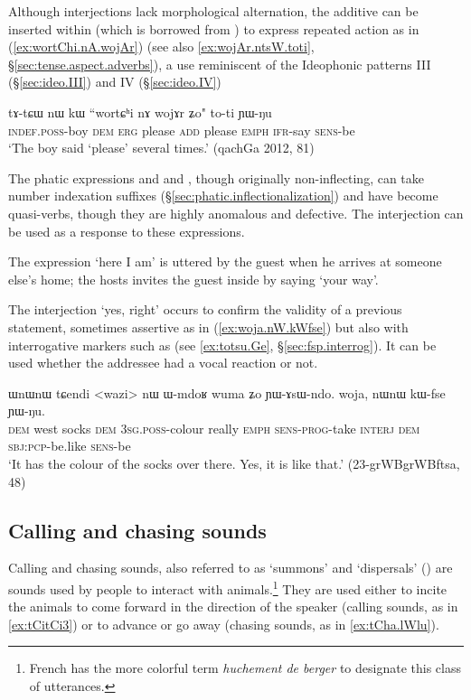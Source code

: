 Although interjections lack morphological alternation, the additive  can be inserted within  (which is borrowed from ) to express repeated action as in (\ref{ex:wortChi.nA.wojAr}) (see also \ref{ex:wojAr.ntsW.toti}, §\ref{sec:tense.aspect.adverbs}), a use reminiscent of the Ideophonic patterns III (§\ref{sec:ideo.III}) and IV (§\ref{sec:ideo.IV})

 \begin{exe}
\ex \label{ex:wortChi.nA.wojAr}
\gll tɤ-tɕɯ nɯ kɯ ``wortɕʰi nɤ wojɤr ʑo" to-ti ɲɯ-ŋu \\
\textsc{indef}.\textsc{poss}-boy \textsc{dem} \textsc{erg} please \textsc{add} please \textsc{emph} \textsc{ifr}-say \textsc{sens}-be \\
\glt `The boy said `please' several times.' (qachGa 2012, 81)
\end{exe}

The phatic expressions and  and , though originally non-inflecting, can take number indexation suffixes (§\ref{sec:phatic.inflectionalization}) and have become quasi-verbs, though they are highly anomalous and defective. The interjection  can be used as a response to these expressions.

The expression  `here I am' is uttered by the guest when he arrives at someone else's home; the hosts invites the guest inside by saying  `your way'.

The interjection  `yes, right' occurs to confirm the validity of a previous statement, sometimes assertive as in (\ref{ex:woja.nW.kWfse}) but also with interrogative markers such as  (see \ref{ex:totsu.Ge}, §\ref{sec:fsp.interrog}). It can be used whether the addressee had a vocal reaction or not.

\begin{exe}
\ex \label{ex:woja.nW.kWfse}
\gll ɯnɯnɯ tɕendi <wazi> nɯ ɯ-mdoʁ wuma ʑo ɲɯ-ɤsɯ-ndo. woja, nɯnɯ kɯ-fse ɲɯ-ŋu. \\
\textsc{dem} west socks \textsc{dem} \textsc{3sg}.\textsc{poss}-colour really \textsc{emph} \textsc{sens}-\textsc{prog}-take \textsc{interj} \textsc{dem} \textsc{sbj}:\textsc{pcp}-be.like \textsc{sens}-be \\
\glt `It has the colour of the socks over there. Yes, it is like that.' (23-grWBgrWBftsa, 48)
\end{exe} 


\subsection{Calling  and chasing sounds} \label{sec:call}
Calling and chasing sounds, also referred to as `summons' and `dispersals' (\citealt[318--319]{aikhenvald10imperative}) are sounds used by people to interact with animals.\footnote{French has the more colorful term \textit{huchement de berger} to designate this class of utterances.} They are used either to incite the animals to come forward in the direction of the speaker (calling sounds, as in \ref{ex:tCitCi3}) or to advance or go away (chasing sounds, as in \ref{ex:tCha.lWlu}). 

